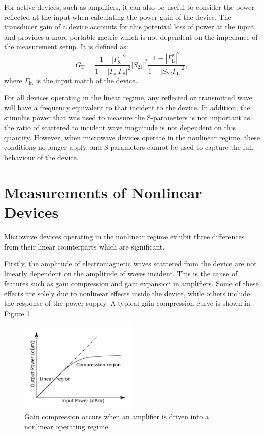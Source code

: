 \documentclass[../thesis/thesis.tex]{subfiles}
\begin{document}
For active devices, such as amplifiers, it can also be useful to consider the power reflected at the input when calculating the power gain of the device. The transducer gain of a device accounts for this potential loss of power at the input and provides a more portable metric which is not dependent on the impedance of the measurement setup. It is defined as:
\begin{equation}
G_\textrm{T} = \dfrac{1-|\Gamma_\textrm{S}|^2}
{1-|\Gamma_\textrm{in}\Gamma_\textrm{S}|^2}
|S_{21}|^2
\dfrac{1-|\Gamma_\textrm{L}^2|^2}
{1-|S_{22}\Gamma_\textrm{L}|^2},
\end{equation}
where $\Gamma_\textrm{in}$ is the input match of the device.

For all devices operating in the linear regime, any reflected or transmitted wave will have a frequency equivalent to that incident to the device. In addition, the stimulus power that was used to measure the S-parameters is not important as the ratio of scattered to incident wave magnitude is not dependent on this quantity. However, when microwave devices operate in the nonlinear regime, these conditions no longer apply, and S-parameters cannot be used to capture the full behaviour of the device.

\section{Measurements of Nonlinear Devices}

Microwave devices operating in the nonlinear regime exhibit three differences from their linear counterparts which are significant.

Firstly, the amplitude of electromagnetic waves scattered from the device are not linearly dependent on the amplitude of waves incident. This is the cause of features such as gain compression and gain expansion in amplifiers. Some of these effects are solely due to nonlinear effects inside the device, while others include the response of the power supply. A typical gain compression curve is shown in Figure \ref{ch2_fig_comp}.

\begin{figure}
	\centering
	\includegraphics[width=0.5\textwidth]{ch2_compression}
	\caption[An illustration of gain compression.]{Gain compression occurs when an amplifier is driven into a nonlinear operating regime.}
	\label{ch2_fig_comp}
\end{figure}
\end{document}

